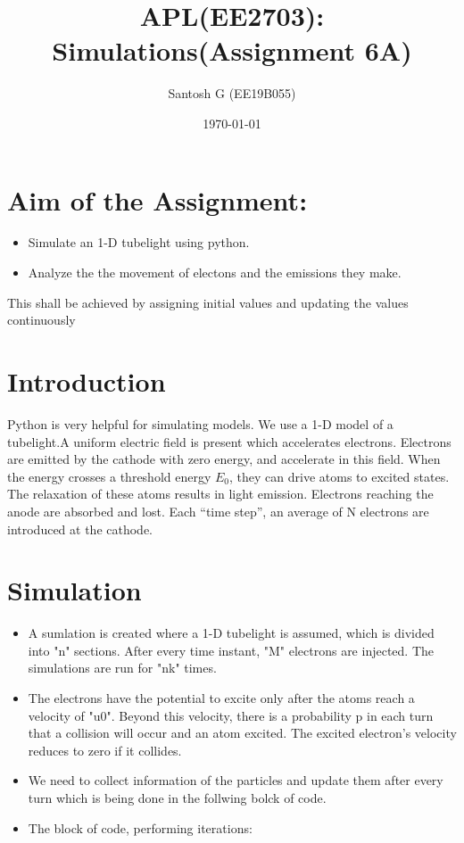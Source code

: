 \documentclass[11pt, a4paper]{article}
\title{APL(EE2703): Simulations(Assignment 6A)} %
\author{Santosh G  (EE19B055)} %
\date{\today} %
\begin{document}
    \maketitle %

    \section{Aim of the Assignment:}   %
        \begin{itemize}
            \item Simulate an 1-D tubelight using python.
            \item Analyze the the movement of electons and the emissions they make.
        \end{itemize}
        This shall be achieved by assigning initial values and updating the values continuously
    \section{Introduction}
    Python is very helpful for simulating models. We use a 1-D model of a tubelight.A uniform electric field is present which accelerates electrons. Electrons are emitted by the cathode with zero energy, and accelerate in this field. When the energy crosses a threshold energy $E_0$, they can drive atoms to excited states. The relaxation of these atoms results in light emission. Electrons reaching the anode are absorbed and lost. Each “time step”, an average of N electrons are introduced at the cathode.
       
        \section{Simulation}
            \begin{itemize}
	    \item
	    A sumlation is created where a 1-D tubelight is assumed, which is divided into "n" sections. After every time instant, "M" electrons are injected. The simulations are run for "nk" times. 
	    \item
	    The electrons have the potential to excite only after the atoms reach a velocity of "u0". Beyond this velocity, there is a probability p in each turn that a collision will occur and an atom excited. The excited electron’s velocity reduces to zero if it collides.
	    \item
	    We need to collect information of the particles and update them after every turn which is being done in the follwing bolck of code.
	    \item
	    The block of code, performing iterations:
	    \end{itemize}
    
\end{document}
